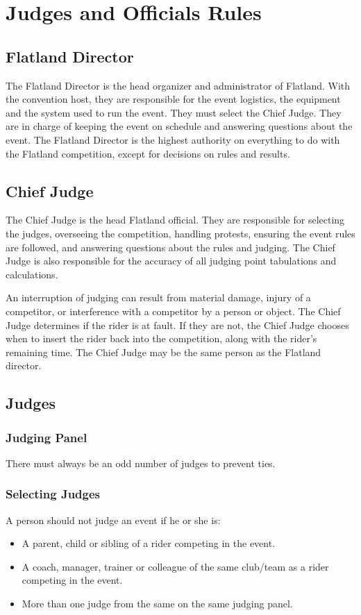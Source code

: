 \chapter{Judges and Officials Rules}

\section{Flatland Director}

The Flatland Director is the head organizer and administrator of Flatland.
With the convention host, they are responsible for the event logistics, the equipment and the system used to run the event.
They must select the Chief Judge.
They are in charge of keeping the event on schedule and answering questions about the event.
The Flatland Director is the highest authority on everything to do with the Flatland competition, except for decisions on rules and results.

\section{Chief Judge}

The Chief Judge is the head Flatland official.
They are responsible for selecting the judges, overseeing the competition, handling protests, ensuring the event rules are followed, and answering questions about the rules and judging.
The Chief Judge is also responsible for the accuracy of all judging point tabulations and calculations.

An interruption of judging can result from material damage, injury of a competitor, or interference with a competitor by a person or object.
The Chief Judge determines if the rider is at fault.
If they are not, the Chief Judge chooses when to insert the rider back into the competition, along with the rider's remaining time.
The Chief Judge may be the same person as the Flatland director.

\section{Judges}

\subsection{Judging Panel}

There must always be an odd number of judges to prevent ties. 

\subsection{Selecting Judges}
A person should not judge an event if he or she is:
\begin{itemize}
\item A parent, child or sibling of a rider competing in the event.
\item A coach, manager, trainer or colleague of the same club/team as a rider competing in the event. 
\item More than one judge from the same on the same judging panel.
\end{itemize}

